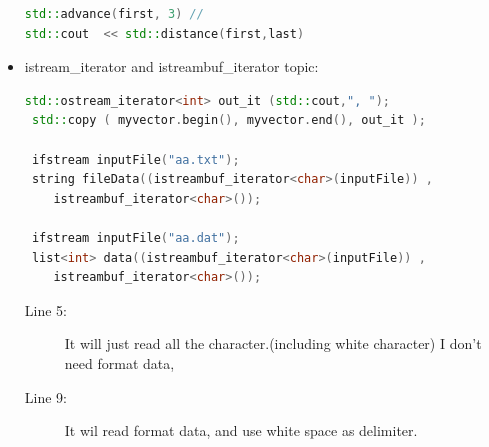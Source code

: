 \documentclass[a4paper,11pt,twoside]{book}
\begin{document}
\begin{itemize}
\begin{lstlisting}[frame=single, language=c++]
std::advance(first, 3) //
std::cout  << std::distance(first,last)
\end{lstlisting}


\item istream\_iterator and istreambuf\_iterator topic:
\begin{lstlisting}[frame=single, language=c++]
 std::ostream_iterator<int> out_it (std::cout,", ");
 std::copy ( myvector.begin(), myvector.end(), out_it );

 ifstream inputFile("aa.txt");
 string fileData((istreambuf_iterator<char>(inputFile)) ,
	istreambuf_iterator<char>());

 ifstream inputFile("aa.dat");
 list<int> data((istreambuf_iterator<char>(inputFile)) ,
	istreambuf_iterator<char>());
\end{lstlisting}
\begin{description}
	\item[Line 5:] It will just read all the character.(including white character) I don't need format data,
	\item[Line 9:] It wil  read format data, and use white space as delimiter.
\end{description}

\end{itemize}
\end{document}
